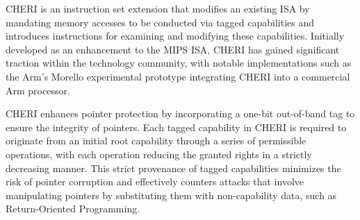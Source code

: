 CHERI\cite{woodruff_cheri_2019} is an instruction set extension that modifies an existing ISA\cite{watson_capability_nodate} by mandating memory accesses to be conducted via tagged 
capabilities and introduces instructions for examining and modifying these capabilities. Initially developed as an 
enhancement to the MIPS ISA, CHERI has gained significant traction within the technology community, 
with notable implementations such as the Arm's Morello\cite{noauthor_arm_nodate} experimental prototype integrating CHERI into a 
commercial Arm processor.
\newline

CHERI enhances pointer protection by incorporating a one-bit out-of-band tag to ensure the integrity of pointers. Each tagged capability in CHERI is required to originate from an initial root capability through a series of permissible 
operations, with each operation reducing the granted rights in a strictly decreasing manner. This strict provenance of tagged capabilities minimizes the 
risk of pointer corruption and effectively counters attacks that 
involve manipulating pointers by substituting them with non-capability data, such as Return-Oriented Programming.
\newline

